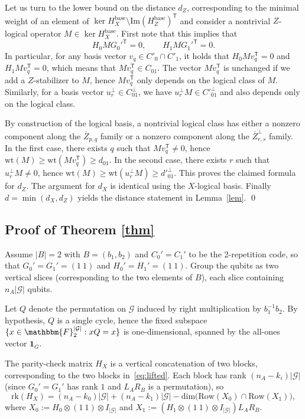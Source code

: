 \documentclass[a4paper,onecolumn,11pt]{quantumarticle}
\def\G{\mathcal{G}}
\newcommand{\wt}{\mathrm{wt}}
\def\F{\mathbbm{F}}
\def\dim{\mbox{dim}}
\def\Row{\text{Row}}
\def\rk{\mbox{rk}}
\begin{document}
Let us turn to the lower bound on the distance $d_Z$, corresponding to the minimal weight of an element of $\ker H^{\text{base}}_X \setminus  \mathrm{Im} (H^{\text{base}}_Z)^{\mathsf T}$ and consider a nontrivial $Z$-logical operator $M \in \ker H^{\text{base}}_X$. 
First note that this implies that 
\[ H_0 MG_0'^{\mathsf T} = 0, \qquad H_1 M G_1'^{\mathsf T} = 0.\]
In particular, for any basis vector $v_q \in C'_0 \cap C'_1$, it holds that $H_0 M v_q^{\mathsf T} = 0$ and $H_1 M v_q^{\mathsf T} =0$, which means that $M v_q^{\mathsf T} \in C_{01}$. The vector $M v_q^{\mathsf T}$ is unchanged if we add a $Z$-stabilizer to $M$, hence $M v_q^{\mathsf T}$ only depends on the logical class of $M$.
Similarly, for a basis vector $u_r^\perp\in C_{01}^\perp$, we have $u_r^\perp M\in C'^\perp_{01}$ and also depends only on the logical class.

By construction of the logical basis, a nontrivial logical class has either a nonzero component along the $\bar Z_{p,q}$ family or a nonzero component along the $\bar Z_{r,s}^\perp$ family.
In the first case, there exists $q$ such that $M v_q^{\mathsf T}\neq 0$, hence $\wt(M)\ge \wt(M v_q^{\mathsf T})\ge d_{01}$.
In the second case, there exists $r$ such that $u_r^\perp M\neq 0$, hence $\wt(M)\ge \wt(u_r^\perp M)\ge d'^\perp_{01}$.
This proves the claimed formula for $d_Z$.
The argument for $d_X$ is identical using the $X$-logical basis.
Finally $d=\min(d_X,d_Z)$ yields the distance statement in Lemma~\ref{lem}.
\qed




\subsection{Proof of Theorem \ref{thm}}




Assume $|B|=2$ with $B=(b_1,b_2)$ and $C_0'=C_1'$ to be the 2-repetition code, so that $G_0'=G_1'=(1\ 1)$ and $H_0'=H_1'=(1\ 1)$.
Group the qubits as two vertical slices (corresponding to the two elements of $B$), each slice containing $n_A|\G|$ qubits.

Let $Q$ denote the permutation on $\G$ induced by right multiplication by $b_1^{-1}b_2$.
By hypothesis, $Q$ is a single cycle, hence the fixed subspace $\{x\in\F_2^{|\G|} : xQ=x\}$ is one-dimensional, spanned by the all-ones vector $\mathbf 1_G$.

The parity-check matrix $H_X$ is a vertical concatenation of two blocks, corresponding to the two blocks in~\eqref{eq:lifted}.
Each block has rank $(n_A-k_i)|\G|$ (since $G_0'=G_1'$ has rank $1$ and $L_AR_B$ is a permutation), so
\[
\rk(H_X)=(n_A-k_0)|\G|+(n_A-k_1)|\G|-\dim\bigl(\Row(X_0)\cap \Row(X_1)\bigr),
\]
where $X_0:=H_0\otimes (1\ 1)\otimes I_{|\G|}$ and $X_1:=(H_1\otimes (1\ 1)\otimes I_{|\G|})L_AR_B$.
\end{document}
